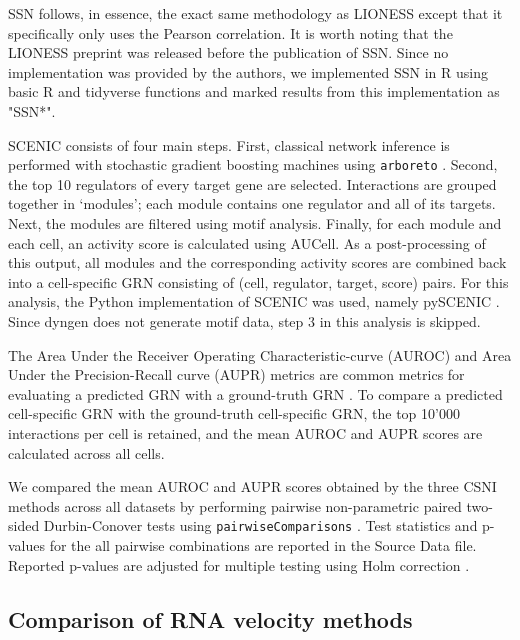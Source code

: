 \documentclass[10pt, a4paper]{article}
\begin{document}
SSN \cite{liu_personalizedcharacterizationdiseases_2016} follows, in
essence, the exact same methodology as LIONESS except that it
specifically only uses the Pearson correlation. It is worth noting that
the LIONESS preprint was released before the publication of SSN. Since
no implementation was provided by the authors, we implemented SSN in R
using basic R and tidyverse functions
\cite{wickham_welcometidyverse_2019} and marked results from this
implementation as "SSN*".

SCENIC \cite{aibar_scenicsinglecellregulatory_2017} consists of four
main steps. First, classical network inference is performed with
stochastic gradient boosting machines using \texttt{arboreto}
\cite{moerman_grnboost2arboretoefficient_2019}. Second, the top 10
regulators of every target gene are selected. Interactions are grouped
together in `modules'; each module contains one regulator and all of its
targets. Next, the modules are filtered using motif analysis. Finally,
for each module and each cell, an activity score is calculated using
AUCell. As a post-processing of this output, all modules and the
corresponding activity scores are combined back into a cell-specific GRN
consisting of (cell, regulator, target, score) pairs. For this analysis,
the Python implementation of SCENIC was used, namely pySCENIC
\cite{vandesande_scalablescenicworkflow_2020}. Since dyngen does not
generate motif data, step 3 in this analysis is skipped.

The Area Under the Receiver Operating Characteristic-curve (AUROC) and
Area Under the Precision-Recall curve (AUPR) metrics are common metrics
for evaluating a predicted GRN with a ground-truth GRN
\cite{marbach_generatingrealisticsilico_2009}. To compare a
predicted cell-specific GRN with the ground-truth cell-specific GRN, the
top 10'000 interactions per cell is retained, and the mean AUROC and
AUPR scores are calculated across all cells.

We compared the mean AUROC and AUPR scores obtained by the three CSNI
methods across all datasets by performing pairwise non-parametric paired
two-sided Durbin-Conover tests
\cite{conover_multiplecomparisonsprocedures_1979} using
\texttt{pairwiseComparisons}
\cite{patil_pairwisecomparisonsmultiplepairwise_2019}. Test
statistics and p-values for the all pairwise combinations are reported
in the Source Data file. Reported p-values are adjusted for multiple
testing using Holm correction
\cite{holm_simplesequentiallyrejective_1979}.

\hypertarget{sec:dyngen-velcompare}{%
	\subsection*{Comparison of RNA velocity
		methods}\label{sec:dyngen-velcompare}}
\end{document}
